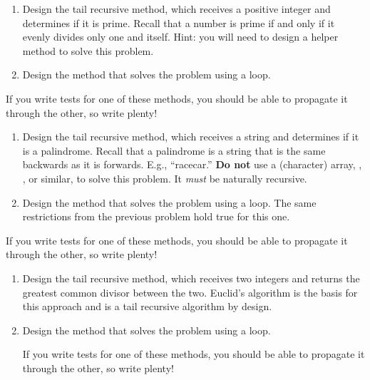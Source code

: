 \begin{enumerate}[label=(\alph*)]
    \item Design the  tail recursive method, which receives a positive integer and determines if it is prime. Recall that a number is prime if and only if it evenly divides only one and itself. Hint: you will need to design a  helper method to solve this problem.
    \item Design the  method that solves the problem using a loop.
\end{enumerate}

If you write tests for one of these methods, you should be able to propagate it through the other, so write plenty!

\begin{enumerate}[label=(\alph*)]
    \item Design the  tail recursive method, which receives a string and determines if it is a palindrome. Recall that a palindrome is a string that is the same backwards as it is forwards. E.g., ``racecar.'' \textbf{Do not} use a (character) array, , , or similar, to solve this problem. It \emph{must} be naturally recursive.
    \item Design the  method that solves the problem using a loop. The same restrictions from the previous problem hold true for this one.
\end{enumerate}

If you write tests for one of these methods, you should be able to propagate it through the other, so write plenty!

\begin{enumerate}[label=(\alph*)]
    \item Design the  tail recursive method, which receives two integers and returns the greatest common divisor between the two. Euclid's algorithm is the basis for this approach and is a tail recursive algorithm by design.
    \item Design the  method that solves the problem using a loop.

    If you write tests for one of these methods, you should be able to propagate it through the other, so write plenty!
\end{enumerate}


